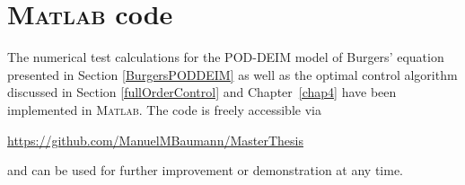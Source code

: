 \section{\textsc{Matlab} code}
The numerical test calculations for the POD-DEIM model of Burgers' equation presented in Section \ref{BurgersPODDEIM} as well as the optimal control algorithm discussed in Section \ref{fullOrderControl} and \mbox{Chapter \ref{chap4}} have been implemented in \textsc{Matlab}. The code is freely accessible via
\begin{center}
\url{https://github.com/ManuelMBaumann/MasterThesis}
\end{center}
and can be used for further improvement or demonstration at any time. 